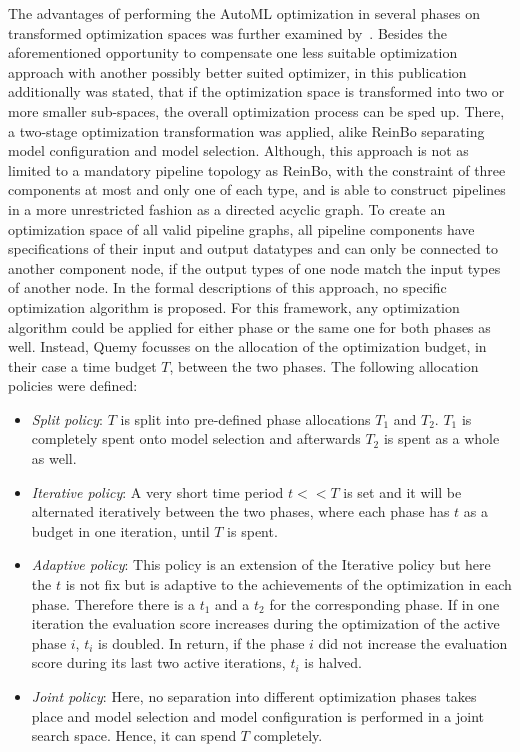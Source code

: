 The advantages of performing the AutoML optimization in several phases on transformed optimization spaces was further examined by~\textcite{Quemy-Two-Stage-Optimization}.
Besides the aforementioned opportunity to compensate one less suitable optimization approach with another possibly better suited optimizer, in this publication additionally was stated, that if the optimization space is transformed into two or more smaller sub-spaces, the overall optimization process can be sped up.
There, a two-stage optimization transformation was applied, alike ReinBo separating model configuration and model selection.
Although, this approach is not as limited to a mandatory pipeline topology as ReinBo, with the constraint of three components at most and only one of each type, and is able to construct pipelines in a more unrestricted fashion as a directed acyclic graph.
To create an optimization space of all valid pipeline graphs, all pipeline components have specifications of their input and output datatypes and can only be connected to another component node, if the output types of one node match the input types of another node.\newline
In the formal descriptions of this approach, no specific optimization algorithm is proposed.
For this framework, any optimization algorithm could be applied for either phase or the same one for both phases as well.
Instead, Quemy focusses on the allocation of the optimization budget, in their case a time budget $T$, between the two phases.
The following allocation policies were defined:
\begin{itemize}
    \item \textit{Split policy}: $T$ is split into pre-defined phase allocations $T_1$ and $T_2$. $T_1$ is completely spent onto model selection and afterwards $T_2$ is spent as a whole as well.
    \item \textit{Iterative policy}: A very short time period $t << T$ is set and it will be alternated iteratively between the two phases, where each phase has $t$ as a budget in one iteration, until $T$ is spent.
    \item \textit{Adaptive policy}: This policy is an extension of the Iterative policy but here the $t$ is not fix but is adaptive to the achievements of the optimization in each phase.
    Therefore there is a $t_1$ and a $t_2$ for the corresponding phase.
    If in one iteration the evaluation score increases during the optimization of the active phase $i$, $t_i$ is doubled.
    In return, if the phase $i$ did not increase the evaluation score during its last two active iterations, $t_i$ is halved.
    \item \textit{Joint policy}: Here, no separation into different optimization phases takes place and model selection and model configuration is performed in a joint search space.
    Hence, it can spend $T$ completely.
\end{itemize}


